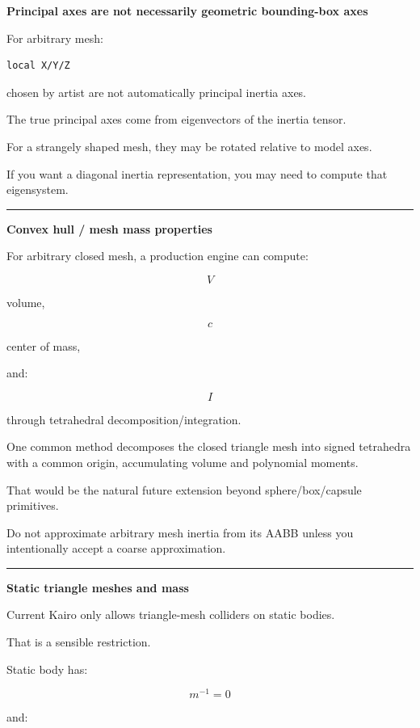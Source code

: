 \textbf{Principal axes are not necessarily geometric bounding-box axes}

For arbitrary mesh:

\begin{verbatim}
local X/Y/Z
\end{verbatim}

chosen by artist are not automatically principal inertia axes.

The true principal axes come from eigenvectors of the inertia tensor.

For a strangely shaped mesh, they may be rotated relative to model axes.

If you want a diagonal inertia representation, you may need to compute that eigensystem.

\begin{center}\rule{0.5\linewidth}{0.5pt}\end{center}

\textbf{Convex hull / mesh mass properties}

For arbitrary closed mesh, a production engine can compute:

\[
V
\]

volume,

\[
c
\]

center of mass,

and:

\[
I
\]

through tetrahedral decomposition/integration.

One common method decomposes the closed triangle mesh into signed tetrahedra with a common origin, accumulating volume and polynomial moments.

That would be the natural future extension beyond sphere/box/capsule primitives.

Do not approximate arbitrary mesh inertia from its AABB unless you intentionally accept a coarse approximation.

\begin{center}\rule{0.5\linewidth}{0.5pt}\end{center}

\textbf{Static triangle meshes and mass}

Current Kairo only allows triangle-mesh colliders on static bodies.

That is a sensible restriction.

Static body has:

\[
m^{-1}=0
\]

and:


